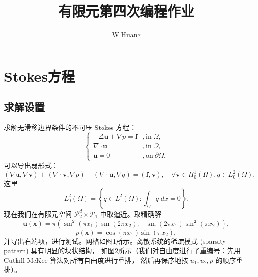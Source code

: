 \documentclass[lang=cn,11pt,a4paper]{elegantpaper}
\title{有限元第四次编程作业}
\author{W Huang}
\date{\zhtoday}
\begin{document}
\maketitle

\section{Stokes方程}

\subsection{求解设置}

求解无滑移边界条件的不可压 Stokes 方程：
\begin{equation}
    \left\{
        \begin{array}{ll}
            -\Delta \mathbf{u}+\nabla p = \mathbf{f}& ,\text{in}\;\Omega,\\
            \nabla\cdot \mathbf{u}& ,\text{in}\;\Omega,\\
            \mathbf{u} = 0& ,\text{on}\;\partial \Omega.
        \end{array}
    \right.
\end{equation}
可以导出弱形式：
\begin{equation}
    (\nabla \mathbf{u},\nabla \mathbf{v}) 
    + (\nabla\cdot \mathbf{v},\nabla p)
    + (\nabla\cdot \mathbf{u},\nabla q)
    = (\mathbf{f},\mathbf{v}),\quad \forall \mathbf{v}\in H_0^1(\Omega),q\in L_0^2(\Omega).
\end{equation}
这里
\begin{equation}
    L_0^2(\Omega)=\left\{q\in L^2(\Omega):\int_\Omega q\;dx=0\right\}.
\end{equation}
现在我们在有限元空间 $\mathcal{P}_2^d\times \mathcal{P}_1$ 中取逼近。取精确解
\begin{equation}
    \mathbf{u}(\mathbf{x}) = \pi(\sin^2(\pi x_1)\sin(2\pi x_2),-\sin(2\pi x_1)\sin^2(\pi x_2)),
\end{equation}
\begin{equation}
    p(\mathbf{x}) = \cos(\pi x_1)\sin(\pi x_2),
\end{equation}
并导出右端项，进行测试。网格如图1所示。离散系统的稀疏模式 
(sparsity pattern) 具有明显的块状结构，
如图2所示（我们对自由度进行了重编号：先用 Cuthill McKee 
算法对所有自由度进行重排，
然后再保序地按 $u_1,u_2,p$ 的顺序重排）。
\end{document}
